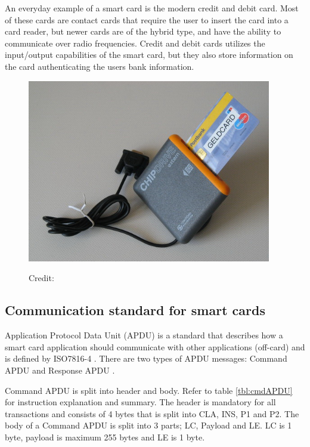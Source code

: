 An everyday example of a smart card is the modern credit and debit card. Most of these cards are contact cards that require the user to insert the card into a card reader, but newer cards are of the hybrid type, and have the ability to communicate over radio frequencies. Credit and debit cards utilizes the input/output capabilities of the smart card, but they also store information on the card authenticating the users bank information.

\begin{figure}[h!]
  \label{fig:nfccard}
  \centering
  \includegraphics[width=0.95\textwidth]{images/chipdrive.jpg}
  \begin{flushright}
  \hspace*{15pt}\hbox{\scriptsize Credit:}
\end{flushright}
\end{figure}

\subsection{Communication standard for smart cards}
\label{sec:communicationstandard}
Application Protocol Data Unit (APDU) is a standard that describes how a smart card application should communicate with other applications (off-card) and is defined by ISO7816-4 \cite{iso7816-4}. There are two types of APDU messages: Command APDU and Response APDU \cite[~Ch. 8.3, Message Structure: APDUS]{smartcardHandbook}.

Command APDU is split into header and body. Refer to table \ref{tbl:cmdAPDU} for instruction explanation and summary. The header is mandatory for all transactions and consists of 4 bytes that is split into CLA, INS, P1 and P2. The body of a Command APDU is split into 3 parts; LC, Payload and LE. LC is 1 byte, payload is maximum 255 bytes and LE is 1 byte.

